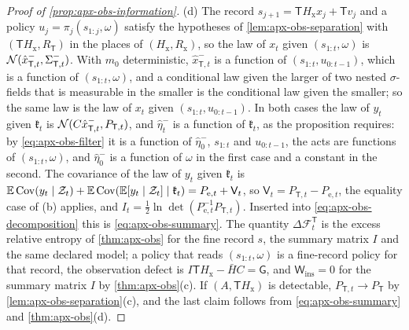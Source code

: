 \begin{proof}[Proof of \cref{prop:apx-obs-information}]
(d) The record $s_{j+1}=\mathsf TH_{\mathrm x}x_j+\mathsf Tv_j$ and a policy $u_j=\pi_j(s_{1:j},\omega)$ satisfy the hypotheses of \cref{lem:apx-obs-separation} with $(\mathsf TH_{\mathrm x},R_{\mathsf T})$ in the places of $(H_{\mathrm x},R_{\mathrm x})$, so the law of $x_t$ given $(s_{1:t},\omega)$ is $\mathcal{N}(\hat x^-_{\mathsf T,t},\Sigma^-_{\mathsf T,t})$. With $m_0$ deterministic, $\hat x^-_{\mathsf T,t}$ is a function of $(s_{1:t},u_{0:t-1})$, which is a function of $(s_{1:t},\omega)$, and a conditional law given the larger of two nested $\sigma$-fields that is measurable in the smaller is the conditional law given the smaller; so the same law is the law of $x_t$ given $(s_{1:t},u_{0:t-1})$. In both cases the law of $y_t$ given $\mathfrak k_t$ is $\mathcal{N}(C\hat x^-_{\mathsf T,t},P_{\mathsf T,t})$, and $\hat\eta^-_t$ is a function of $\mathfrak k_t$, as the proposition requires: by \eqref{eq:apx-obs-filter} it is a function of $\hat\eta^-_0$, $s_{1:t}$ and $u_{0:t-1}$, the acts are functions of $(s_{1:t},\omega)$, and $\hat\eta^-_0$ is a function of $\omega$ in the first case and a constant in the second. The covariance of the law of $y_t$ given $\mathfrak k_t$ is $\mathbb{E}\operatorname{Cov}(y_t\mid\mathcal Z_t)+\mathbb{E}\operatorname{Cov}(\mathbb{E}[y_t\mid\mathcal Z_t]\mid\mathfrak k_t)=P_{\mathrm e,t}+\mathsf V_t$, so $\mathsf V_t=P_{\mathsf T,t}-P_{\mathrm e,t}$, the equality case of (b) applies, and $I_t=\frac12\ln\det(P_{\mathrm e,t}^{-1}P_{\mathsf T,t})$. Inserted into \eqref{eq:apx-obs-decomposition} this is \eqref{eq:apx-obs-summary}. The quantity $\Delta\mathcal F^{\mathsf T}_t$ is the excess relative entropy of \cref{thm:apx-obs} for the fine record $s$, the summary matrix $I$ and the same declared model; a policy that reads $(s_{1:t},\omega)$ is a fine-record policy for that record, the observation defect is $I\mathsf TH_{\mathrm x}-\bar HC=\mathsf G$, and $\mathsf W_{\mathrm{ins}}=0$ for the summary matrix $I$ by \cref{thm:apx-obs}(c). If $(A,\mathsf TH_{\mathrm x})$ is detectable, $P_{\mathsf T,t}\to P_{\mathsf T}$ by \cref{lem:apx-obs-separation}(c), and the last claim follows from \eqref{eq:apx-obs-summary} and \cref{thm:apx-obs}(d).


\end{proof}
